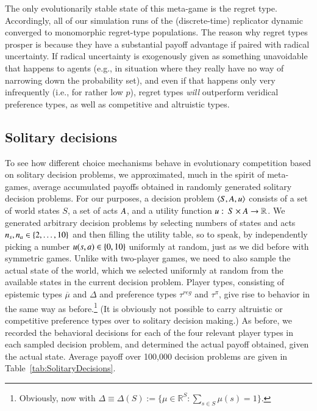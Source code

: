 \documentclass[fleqn,reqno,11pt]{article}
\begin{document}
The only evolutionarily stable state of this meta-game is the regret type. Accordingly, all of
our simulation runs of the (discrete-time) replicator dynamic converged to monomorphic
regret-type populations. The reason why regret types prosper is because they have a substantial
payoff advantage if paired with radical uncertainty. If radical uncertainty is exogenously
given as something unavoidable that happens to agents (e.g., in situation where they really have no
way of narrowing down the probability set), and even if that happens only very
infrequently (i.e., for rather low $p$), regret types \emph{will} outperform veridical
preference types, as well as competitive and altruistic types.


\subsection{Solitary decisions}
\label{sec:solitary-decisions}


To see how different choice mechanisms behave in evolutionary competition based on solitary decision
problems, we approximated, much in the spirit of meta-games, average accumulated payoffs
obtained in randomly generated solitary decision problems. For our purposes, a decision problem
$\left \langle S, A, u\right\rangle$ consists of a set of world states $S$, a set of acts
$A$, and a utility function $u \thinspace \colon \thinspace S \times A \rightarrow
\mathbb{R}$.
We generated arbitrary decision problems by selecting numbers of states and acts
$n_s, n_a \in \left\{2, \dots, 10\right\}$ and then filling the utility table, so to speak, by
independently picking a number $u(s, a) \in \left\{0, 10\right\}$ uniformly at random, just
as we did before with symmetric games. Unlike with two-player games, we need to also sample the
actual state of the world, which we selected uniformly at random from the available states in
the current decision problem. Player types, consisting of epistemic types $\overline{\mu}$ and
$\Delta$ and preference types $\tau^{reg}$ and $\tau^{\pi}$, give rise to behavior in
the same way as before.\footnote{Obviously, now with $ \Delta \equiv \Delta(S) :=\lbrace \mu \in \mathbb{R}^{S}: \sum_{s \in S} \mu(s) = 1 \rbrace$.} (It is obviously not possible to carry altruistic or competitive
preference types over to solitary decision making.) As before, we recorded the behavioral
decisions for each of the four relevant player types in each sampled decision problem, and
determined the actual payoff obtained, given the actual state. Average payoff over 100,000 decision
problems are given in Table~\ref{tab:SolitaryDecisions}.
\end{document}
